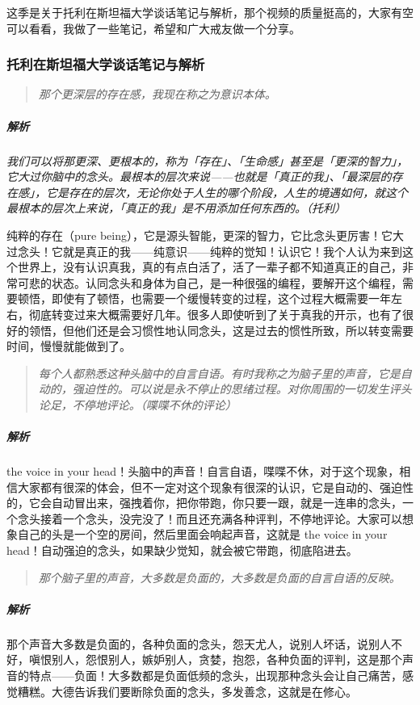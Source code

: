 这季是关于托利在斯坦福大学谈话笔记与解析，那个视频的质量挺高的，大家有空可以看看，我做了一些笔记，希望和广大戒友做一个分享。

\subsubsection{托利在斯坦福大学谈话笔记与解析}

\begin{quote}\it
    那个更深层的存在感，我现在称之为意识本体。
\end{quote}

\subparagraph{解析} \textit{我们可以将那更深、更根本的，称为「存在」、「生命感」甚至是「更深的智力」，它大过你脑中的念头。最根本的层次来说——也就是「真正的我」、「最深层的存在感」，它是存在的层次，无论你处于人生的哪个阶段，人生的境遇如何，就这个最根本的层次上来说，「真正的我」是不用添加任何东西的。（托利）}

纯粹的存在（pure being），它是源头智能，更深的智力，它比念头更厉害！它大过念头！它就是真正的我——纯意识——纯粹的觉知！认识它！我个人认为来到这个世界上，没有认识真我，真的有点白活了，活了一辈子都不知道真正的自己，非常可悲的状态。认同念头和身体为自己，是一种很强的编程，要解开这个编程，需要顿悟，即使有了顿悟，也需要一个缓慢转变的过程，这个过程大概需要一年左右，彻底转变过来大概需要好几年。很多人即使听到了关于真我的开示，也有了很好的领悟，但他们还是会习惯性地认同念头，这是过去的惯性所致，所以转变需要时间，慢慢就能做到了。

\begin{quote}\it
    每个人都熟悉这种头脑中的自言自语。有时我称之为脑子里的声音，它是自动的，强迫性的。可以说是永不停止的思绪过程。对你周围的一切发生评头论足，不停地评论。（喋喋不休的评论）
\end{quote}

\subparagraph{解析} the voice in your head！头脑中的声音！自言自语，喋喋不休，对于这个现象，相信大家都有很深的体会，但不一定对这个现象有很深的认识，它是自动的、强迫性的，它会自动冒出来，强拽着你，把你带跑，你只要一跟，就是一连串的念头，一个念头接着一个念头，没完没了！而且还充满各种评判，不停地评论。大家可以想象自己的头是一个空的房间，然后里面会响起声音，这就是 the voice in your head！自动强迫的念头，如果缺少觉知，就会被它带跑，彻底陷进去。

\begin{quote}\it
    那个脑子里的声音，大多数是负面的，大多数是负面的自言自语的反映。
\end{quote}

\subparagraph{解析} 那个声音大多数是负面的，各种负面的念头，怨天尤人，说别人坏话，说别人不好，嗔恨别人，怨恨别人，嫉妒别人，贪婪，抱怨，各种负面的评判，这是那个声音的特点——负面！大多数都是负面低频的念头，出现那种念头会让自己痛苦，感觉糟糕。大德告诉我们要断除负面的念头，多发善念，这就是在修心。


